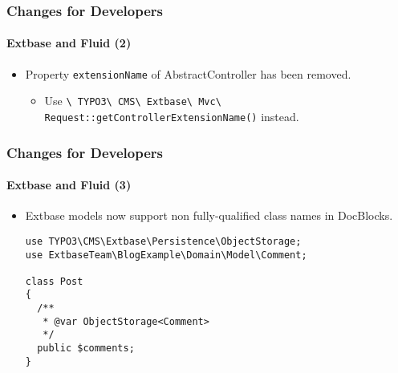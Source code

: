 \begin{frame}[fragile]
	\frametitle{Changes for Developers}
	\framesubtitle{Extbase and Fluid (2)}

	\begin{itemize}
		\item Property \texttt{extensionName} of AbstractController has been removed.

			\begin{itemize}\smaller
				\item[\ding{228}] Use \texttt{\textbackslash
					TYPO3\textbackslash
					CMS\textbackslash
					Extbase\textbackslash
					Mvc\textbackslash
					Request::getControllerExtensionName()} instead.
			\end{itemize}\normalsize

	\end{itemize}

\end{frame}


\begin{frame}[fragile]
	\frametitle{Changes for Developers}
	\framesubtitle{Extbase and Fluid (3)}

	\lstset{basicstyle=\tiny\ttfamily}

	\begin{itemize}
		\item Extbase models now support non fully-qualified class names in DocBlocks.

\begin{lstlisting}
use TYPO3\CMS\Extbase\Persistence\ObjectStorage;
use ExtbaseTeam\BlogExample\Domain\Model\Comment;

class Post
{
  /**
   * @var ObjectStorage<Comment>
   */
  public $comments;
}
\end{lstlisting}

	\end{itemize}

\end{frame}


